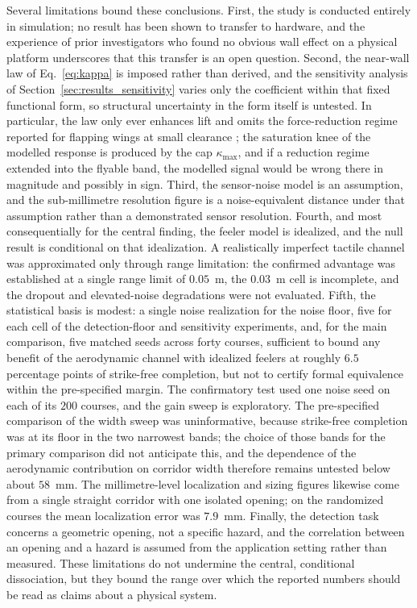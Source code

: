 \documentclass[final,5p,times]{elsarticle}
\begin{document}
Several limitations bound these conclusions. First, the study is conducted entirely in simulation; no result has been shown to transfer to hardware, and the experience of prior investigators who found no obvious wall effect on a physical platform \cite{tu2019acting} underscores that this transfer is an open question. Second, the near-wall law of Eq.~\eqref{eq:kappa} is imposed rather than derived, and the sensitivity analysis of Section~\ref{sec:results_sensitivity} varies only the coefficient within that fixed functional form, so structural uncertainty in the form itself is untested. In particular, the law only ever enhances lift and omits the force-reduction regime reported for flapping wings at small clearance \cite{lu2016ground}; the saturation knee of the modelled response is produced by the cap $\kappa_{\max}$, and if a reduction regime extended into the flyable band, the modelled signal would be wrong there in magnitude and possibly in sign. Third, the sensor-noise model is an assumption, and the sub-millimetre resolution figure is a noise-equivalent distance under that assumption rather than a demonstrated sensor resolution. Fourth, and most consequentially for the central finding, the feeler model is idealized, and the null result is conditional on that idealization. A realistically imperfect tactile channel was approximated only through range limitation: the confirmed advantage was established at a single range limit of $0.05$~m, the $0.03$~m cell is incomplete, and the dropout and elevated-noise degradations were not evaluated. Fifth, the statistical basis is modest: a single noise realization for the noise floor, five for each cell of the detection-floor and sensitivity experiments, and, for the main comparison, five matched seeds across forty courses, sufficient to bound any benefit of the aerodynamic channel with idealized feelers at roughly $6.5$ percentage points of strike-free completion, but not to certify formal equivalence within the pre-specified margin. The confirmatory test used one noise seed on each of its $200$ courses, and the gain sweep is exploratory. The pre-specified comparison of the width sweep was uninformative, because strike-free completion was at its floor in the two narrowest bands; the choice of those bands for the primary comparison did not anticipate this, and the dependence of the aerodynamic contribution on corridor width therefore remains untested below about $58$~mm. The millimetre-level localization and sizing figures likewise come from a single straight corridor with one isolated opening; on the randomized courses the mean localization error was $7.9$~mm. Finally, the detection task concerns a geometric opening, not a specific hazard, and the correlation between an opening and a hazard is assumed from the application setting rather than measured. These limitations do not undermine the central, conditional dissociation, but they bound the range over which the reported numbers should be read as claims about a physical system.
\end{document}
